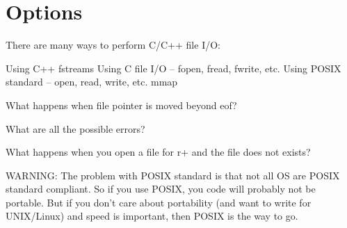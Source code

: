 

\renewcommand\TITLE{File I/O}

\topmatter

\section{Options}

There are many ways to perform C/C++ file I/O:
\begin{itemize}
  \li Using C++ fstreams
  \li Using C file I/O -- fopen, fread, fwrite, etc.
  \li Using POSIX standard -- open, read, write, etc.
  \li mmap
\end{itemize}


What happens when file pointer is moved beyond eof?

What are all the possible errors?

What happens when you open a file for r+ and the file does not exists?
\newpage
{}



\newpage
{}

WARNING: The problem with POSIX standard is that not all OS are POSIX standard
compliant.
So if you use POSIX, you code will probably not be
portable.
But if you don't care about portability (and want to write for UNIX/Linux)
and speed is important, then POSIX is the way to go.





